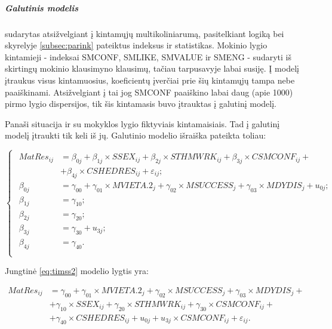 \documentclass[12pt,a4paper]{article}
\begin{document}
\subparagraph{Galutinis modelis} sudarytas atsižvelgiant į kintamųjų multikoliniarumą, pasitelkiant logiką bei skyrelyje \ref{subsec:parink} pateiktus indeksus ir statistikas. Mokinio lygio kintamieji - indeksai SMCONF, SMLIKE, SMVALUE ir SMENG - sudaryti iš skirtingų mokinio klausimyno klausimų, tačiau tarpusavyje labai susiję. Į modelį įtraukus visus kintamuosius, koeficientų įverčiai prie šių kintamųjų tampa nebe paaiškinami. Atsižvelgiant į tai jog SMCONF paaiškino labai daug (apie 1000) pirmo lygio dispersijos, tik šis kintamasis buvo įtrauktas į galutinį modelį.

\indent Panaši situacija ir su mokyklos lygio fiktyviais kintamaisiais. Tad į galutinį modelį įtraukti tik keli iš jų. Galutinio modelio išraiška pateikta toliau:
\begin{small}
\begin{equation} \label{eq:timss2}
\left\{
\begin{array}{l}
\begin{split}
MatRes_{ij}&=\beta_{0j}+\beta_{1j}\times SSEX_{ij}+\beta_{2j} \times STHMWRK_{ij}+\beta_{3j}\times CSMCONF_{ij}+\\
&+\beta_{4j}\times CSHEDRES_{ij}+\varepsilon_{ij};\\
\beta_{0j}&=\gamma_{00}+\gamma_{01}\times MVIETA.2_j+\gamma_{02}\times MSUCCESS_j+\gamma_{03}\times MDYDIS_j+u_{0j};\\
\beta_{1j}& = \gamma_{10};\\
\beta_{2j}&=\gamma_{20};\\
\beta_{3j}&=\gamma_{30}+u_{3j};\\
\beta_{4j}&=\gamma_{40}.\\
\end{split}
\end{array} \right.
\end{equation}
\end{small}
Jungtinė \ref{eq:timss2} modelio lygtis yra:
\begin{small}
\begin{equation} \label{eq:timss3}
\begin{split}
MatRes_{ij}&=\gamma_{00}+\gamma_{01}\times MVIETA.2_j+\gamma_{02}\times MSUCCESS_j+\gamma_{03}\times MDYDIS_j+\\
&+ \gamma_{10}\times SSEX_{ij}+\gamma_{20} \times STHMWRK_{ij}+\gamma_{30}\times CSMCONF_{ij}+\\
&+ \gamma_{40}\times CSHEDRES_{ij}+u_{0j}+u_{3j}\times  CSMCONF_{ij} +\varepsilon_{ij}.
\end{split}
\end{equation}
\end{small}
\end{document}
